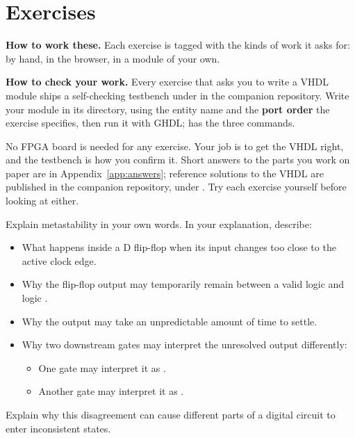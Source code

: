 
\section{Exercises}
\label{c4:sec:exercises}

\begin{aside}
\textbf{How to work these.} Each exercise is tagged with the kinds of work it asks for:
 by hand,  in the browser,  in a module of your own.

\textbf{How to check your work.} Every exercise that asks you to write a VHDL module ships a
self-checking testbench under  in the companion repository. Write your
module in its  directory, using the entity name and the \textbf{port
order} the exercise specifies, then run it with GHDL;  has the three commands.

No FPGA board is needed for any exercise. Your job is to get the VHDL right, and the testbench is
how you confirm it. Short answers to the parts you work on paper are in
Appendix~\ref{app:answers}; reference solutions to the VHDL are published in the companion
repository, under . Try each exercise yourself before looking at
either.
\end{aside}

\label{c4:set:1}

\label{c4:ex:1}
Explain metastability in your own words. In your explanation, describe:
\begin{itemize}
  \item What happens inside a D flip-flop when its input changes too close to the active clock
    edge.
  \item Why the flip-flop output may temporarily remain between a valid logic  and logic
    .
  \item Why the output may take an unpredictable amount of time to settle.
  \item Why two downstream gates may interpret the unresolved output differently:
    \begin{itemize}
      \item One gate may interpret it as .
      \item Another gate may interpret it as .
    \end{itemize}
\end{itemize}
Explain why this disagreement can cause different parts of a digital circuit to enter inconsistent
states.

